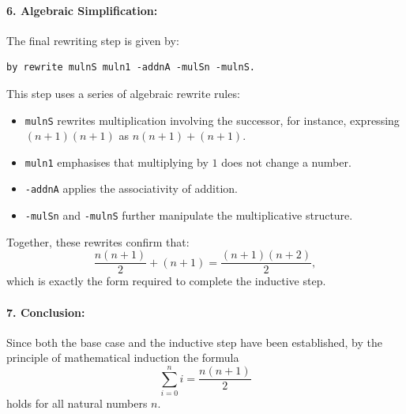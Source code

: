 \documentclass[10pt,nonacm,natbib=false]{acmart}
\begin{document}
\paragraph{6. Algebraic Simplification:}
The final rewriting step is given by:
\begin{verbatim}
by rewrite mulnS muln1 -addnA -mulSn -mulnS.
\end{verbatim}
This step uses a series of algebraic rewrite rules:
\begin{itemize}
    \item \texttt{mulnS} rewrites multiplication involving the successor, for instance, expressing \((n+1)(n+1)\) as \( n(n+1) + (n+1) \).
    \item \texttt{muln1} emphasises that multiplying by \( 1 \) does not change a number.
    \item \texttt{-addnA} applies the associativity of addition.
    \item \texttt{-mulSn} and \texttt{-mulnS} further manipulate the multiplicative structure.
\end{itemize}
Together, these rewrites confirm that:
\[
\frac{n(n+1)}{2} + (n+1) = \frac{(n+1)(n+2)}{2},
\]
which is exactly the form required to complete the inductive step.

\paragraph{7. Conclusion:}
Since both the base case and the inductive step have been established, by the principle of mathematical induction the formula
\[
\sum_{i=0}^{n} i = \frac{n(n+1)}{2}
\]
holds for all natural numbers \( n \).


\newpage


\end{document}
